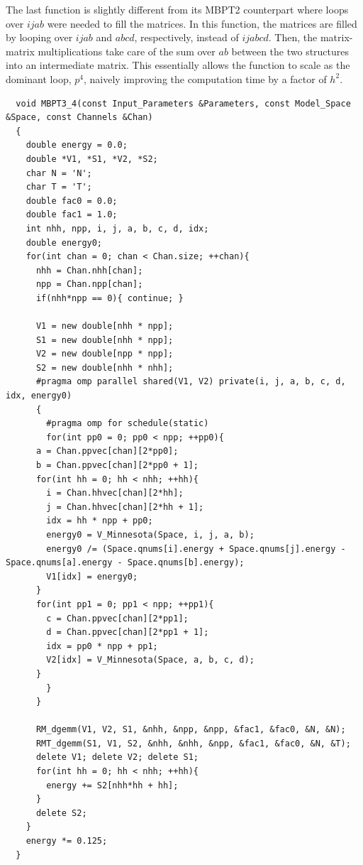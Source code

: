 The last function is slightly different from its MBPT2 counterpart where loops over $ijab$ were needed to fill the matrices. In this function, the matrices are filled by looping over $ijab$ and $abcd$, respectively, instead of $ijabcd$. Then, the matrix-matrix multiplications take care of the sum over $ab$ between the two structures into an intermediate matrix. This essentially allows the function to scale as the dominant loop, $p^4$, naively improving the computation time by a factor of $h^2$.

\begin{lstlisting}
  void MBPT3_4(const Input_Parameters &Parameters, const Model_Space &Space, const Channels &Chan)
  {
    double energy = 0.0;
    double *V1, *S1, *V2, *S2;
    char N = 'N';
    char T = 'T';
    double fac0 = 0.0;
    double fac1 = 1.0;
    int nhh, npp, i, j, a, b, c, d, idx;
    double energy0;
    for(int chan = 0; chan < Chan.size; ++chan){
      nhh = Chan.nhh[chan];
      npp = Chan.npp[chan];
      if(nhh*npp == 0){ continue; }
      
      V1 = new double[nhh * npp];
      S1 = new double[nhh * npp];
      V2 = new double[npp * npp];
      S2 = new double[nhh * nhh];
      #pragma omp parallel shared(V1, V2) private(i, j, a, b, c, d, idx, energy0)
      {
        #pragma omp for schedule(static)
        for(int pp0 = 0; pp0 < npp; ++pp0){
	  a = Chan.ppvec[chan][2*pp0];
	  b = Chan.ppvec[chan][2*pp0 + 1];
	  for(int hh = 0; hh < nhh; ++hh){
	    i = Chan.hhvec[chan][2*hh];
	    j = Chan.hhvec[chan][2*hh + 1];
	    idx = hh * npp + pp0;
	    energy0 = V_Minnesota(Space, i, j, a, b);
	    energy0 /= (Space.qnums[i].energy + Space.qnums[j].energy - Space.qnums[a].energy - Space.qnums[b].energy);
	    V1[idx] = energy0;
	  }
	  for(int pp1 = 0; pp1 < npp; ++pp1){
	    c = Chan.ppvec[chan][2*pp1];
	    d = Chan.ppvec[chan][2*pp1 + 1];
	    idx = pp0 * npp + pp1;
	    V2[idx] = V_Minnesota(Space, a, b, c, d);
	  }
        }
      }
      
      RM_dgemm(V1, V2, S1, &nhh, &npp, &npp, &fac1, &fac0, &N, &N);
      RMT_dgemm(S1, V1, S2, &nhh, &nhh, &npp, &fac1, &fac0, &N, &T);
      delete V1; delete V2; delete S1;
      for(int hh = 0; hh < nhh; ++hh){
        energy += S2[nhh*hh + hh];
      }
      delete S2;
    }
    energy *= 0.125;
  }
\end{lstlisting}

